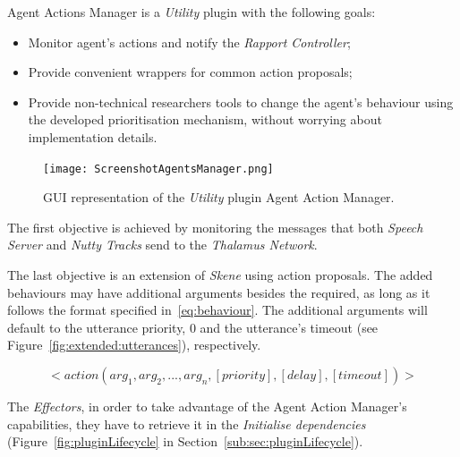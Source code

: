 
Agent Actions Manager is a \textit{Utility} plugin with the following goals:
\begin{itemize}
	\item Monitor agent's actions and notify the \textit{Rapport Controller};
	\item Provide convenient wrappers for common action proposals;
	\item Provide non-technical researchers tools to change the agent's behaviour using the developed prioritisation mechanism, without worrying about implementation details.
\end{itemize}

\begin{figure}[H]
	\centering
	\texttt{[image: ScreenshotAgentsManager.png]}
	\caption{\ac{GUI} representation of the \textit{Utility} plugin Agent Action Manager.}
	\label{fig:agentActionsManagerScreenshot}
\end{figure}

The first objective is achieved by monitoring the messages that both \textit{Speech Server} and \textit{Nutty Tracks} send to the \textit{Thalamus Network}.

The last objective is an extension of \textit{Skene} using action proposals. The added behaviours may have additional arguments besides the required, as long as it follows the format specified in~\ref{eq:behaviour}. The additional arguments will default to the utterance priority, 0 and the utterance's timeout (see Figure~\ref{fig:extended:utterances}), respectively.

\begin{equation}
	<action(arg_1, arg_2, ..., arg_n, [priority],[delay],[timeout])>
	\label{eq:behaviour}
\end{equation}

The \textit{Effectors}, in order to take advantage of the Agent Action Manager's capabilities, they have to retrieve it in the \textit{Initialise dependencies} (Figure~\ref{fig:pluginLifecycle} in Section~\ref{sub:sec:pluginLifecycle}).

